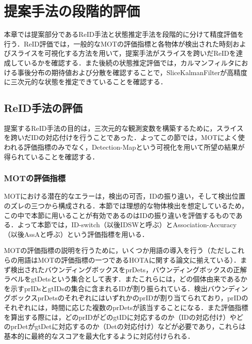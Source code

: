 \section{提案手法の段階的評価}
\label{sec:stage_evaluation}

本章では提案部分であるReID手法と状態推定手法を段階的に分けて精度評価を行う．ReID評価では，一般的なMOTの評価指標と各物体が検出された時刻およびスライスを可視化する方法を用いて，提案手法がスライスを跨いだReIDを達成しているかを確認する．また後続の状態推定評価では，カルマンフィルタにおける事後分布の期待値および分散を確認することで，SliceKalmanFilterが高精度に三次元的な状態を推定できていることを確認する．

    \subsection{ReID手法の評価}
    \label{subsec:reidentification_evaluation}

    提案するReID手法の目的は，三次元的な観測変数を構築するために，スライスを跨いだIDの対応付けを行うことであった．よってこの節では，MOTによく使われる評価指標のみでなく，Detection-Mapという可視化を用いて所望の結果が得られていることを確認する．

        \subsubsection{MOTの評価指標}

        MOTにおける潜在的なエラーは，検出の可否，IDの振り違い，そして検出位置のズレの三つから構成される．本節では理想的な物体検出を想定しているため，この中で本節に用いることが有効であるのはIDの振り違いを評価するものである．よって本節では，ID-switch（以後IDSWと呼ぶ）とAssociation-Accuracy（以後AssAと呼ぶ）という評価指標を用いる．

        MOTの評価指標の説明を行うために，いくつか用語の導入を行う（ただしこれらの用語はMOTの評価指標の一つであるHOTAに関する論文\cite{luiten2021hota}に揃えている）．まず検出されたバウンディングボックスをprDets，バウンディングボックスの正解ラベルをgtDetsという集合として表す．またこれらには，どの個体由来であるかを示すprIDsとgtIDsの集合に含まれるIDが割り振られている．検出バウンディングボックスprDetsのそれぞれにはいずれかのprIDが割り当てられており，prIDのそれぞれには，時間に応じた複数のprDetsが該当することになる．また評価指標を算出する際には，どのprIDがどのgtIDに対応するのか（IDの対応付け）やどのprDetがgtDetに対応するのか（Detの対応付け）などが必要であり，これらは基本的に最終的なスコアを最大化するように対応付けられる．
    

